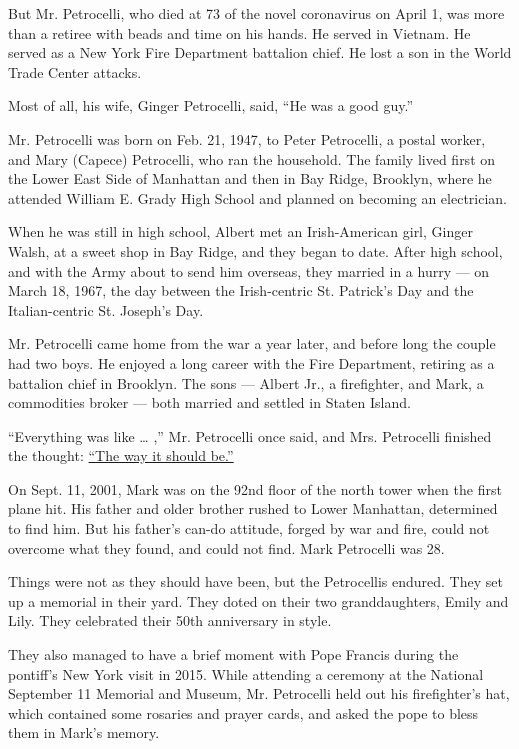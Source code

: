 But Mr. Petrocelli, who died at 73 of the novel coronavirus on April 1,
was more than a retiree with beads and time on his hands. He served in
Vietnam. He served as a New York Fire Department battalion chief. He
lost a son in the World Trade Center attacks.

Most of all, his wife, Ginger Petrocelli, said, ``He was a good guy.''

Mr. Petrocelli was born on Feb. 21, 1947, to Peter Petrocelli, a postal
worker, and Mary (Capece) Petrocelli, who ran the household. The family
lived first on the Lower East Side of Manhattan and then in Bay Ridge,
Brooklyn, where he attended William E. Grady High School and planned on
becoming an electrician.

When he was still in high school, Albert met an Irish-American girl,
Ginger Walsh, at a sweet shop in Bay Ridge, and they began to date.
After high school, and with the Army about to send him overseas, they
married in a hurry --- on March 18, 1967, the day between the
Irish-centric St. Patrick's Day and the Italian-centric St. Joseph's
Day.

Mr. Petrocelli came home from the war a year later, and before long the
couple had two boys. He enjoyed a long career with the Fire Department,
retiring as a battalion chief in Brooklyn. The sons --- Albert Jr., a
firefighter, and Mark, a commodities broker --- both married and settled
in Staten Island.

``Everything was like \ldots{} ,'' Mr. Petrocelli once said, and Mrs.
Petrocelli finished the thought:
\href{https://www.nytimes.com/2003/09/10/nyregion/about-new-york-for-one-9-11-family-five-waves-of-grief.html?searchResultPosition=2}{``The
way it should be.''}

On Sept. 11, 2001, Mark was on the 92nd floor of the north tower when
the first plane hit. His father and older brother rushed to Lower
Manhattan, determined to find him. But his father's can-do attitude,
forged by war and fire, could not overcome what they found, and could
not find. Mark Petrocelli was 28.

Things were not as they should have been, but the Petrocellis endured.
They set up a memorial in their yard. They doted on their two
granddaughters, Emily and Lily. They celebrated their 50th anniversary
in style.

They also managed to have a brief moment with Pope Francis during the
pontiff's New York visit in 2015. While attending a ceremony at the
National September 11 Memorial and Museum, Mr. Petrocelli held out his
firefighter's hat, which contained some rosaries and prayer cards, and
asked the pope to bless them in Mark's memory.

